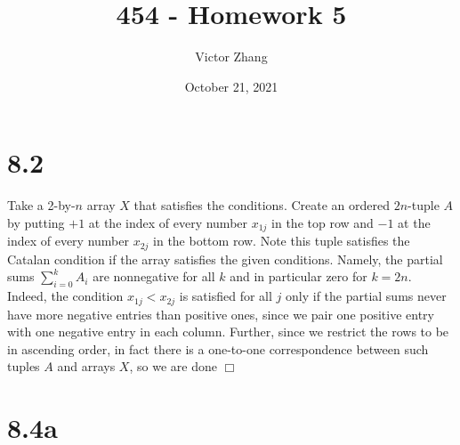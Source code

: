 \documentclass{article}
\title{454 - Homework 5}
\author{Victor Zhang}
\date{October 21, 2021}
\begin{document}
\maketitle

\section*{8.2}
Take a 2-by-$n$ array $X$ that satisfies the conditions. Create an ordered $2n$-tuple $A$ by putting $+ 1$ at the index of every number $x_{1j}$ in the top row and $- 1$ at the index of every number $x_{2j}$ in the bottom row. Note this tuple satisfies the Catalan condition if the array satisfies the given conditions. Namely, the partial sums $\sum_{i=0}^k A_{i}$ are nonnegative for all $k$ and in particular zero for $k = 2n$. Indeed, the condition $x_{1j} < x_{2j}$ is satisfied for all $j$ only if the partial sums never have more negative entries than positive ones, since we pair one positive entry with one negative entry in each column. Further, since we restrict the rows to be in ascending order, in fact there is a one-to-one correspondence between such tuples $A$ and arrays $X$, so we are done $\Box$

\section*{8.4a}
\end{document}

